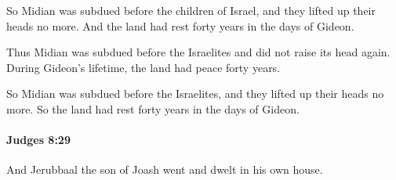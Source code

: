 			\begin{versebox}
					\item[BHS] 
					\item[ASV] So Midian was subdued before the children of Israel, and they lifted up their heads no more. And the land had rest forty years in the days of Gideon.
					\item[NIV] Thus Midian was subdued before the Israelites and did not raise its head again. During Gideon’s lifetime, the land had peace forty years.
					\item[NRSV] So Midian was subdued before the Israelites, and they lifted up their heads no more. So the land had rest forty years in the days of Gideon.
			\end{versebox}

		\paragraph{Judges 8:29} %
			\label{JUDGES-8-29}

			And Jerubbaal the son of Joash went and dwelt in his own house.

